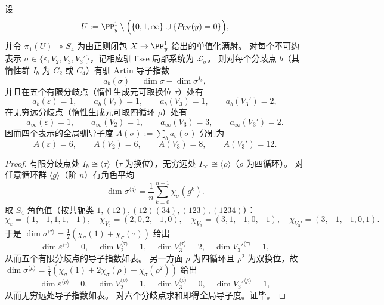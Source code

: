 \begin{conclusion}\label{con:xi-terminal-zm-s4-tame-artin-conductor-spectrum}
设
\[
U:=\PP^1_y\setminus\Bigl(\{0,1,\infty\}\cup\{P_{\mathrm{LY}}(y)=0\}\Bigr),
\]
并令 \(\pi_1(U)\twoheadrightarrow S_4\) 为由正则闭包 \(X\to\PP^1_y\) 给出的单值化满射。
对每个不可约表示 \(\sigma\in\{\varepsilon,V_2,V_3,V_3'\}\)，记相应驯 lisse 局部系统为 \(\mathcal L_\sigma\)。
则对每个分歧点 \(b\)（其惰性群 \(I_b\) 为 \(C_2\) 或 \(C_4\)）有驯 Artin 导子指数
\[
a_b(\sigma)=\dim\sigma-\dim\sigma^{I_b},
\]
并且在五个有限分歧点（惰性生成元可取换位 \(\tau\)）处有
\[
a_b(\varepsilon)=1,\qquad a_b(V_2)=1,\qquad a_b(V_3)=1,\qquad a_b(V_3')=2,
\]
在无穷远分歧点（惰性生成元可取四循环 \(\rho\)）处有
\[
a_\infty(\varepsilon)=1,\qquad a_\infty(V_2)=1,\qquad a_\infty(V_3)=3,\qquad a_\infty(V_3')=2.
\]
因而四个表示的全局驯导子度
\(
A(\sigma):=\sum_b a_b(\sigma)
\)
分别为
\[
A(\varepsilon)=6,\qquad A(V_2)=6,\qquad A(V_3)=8,\qquad A(V_3')=12.
\]
\end{conclusion}
\begin{proof}
有限分歧点处 \(I_b\cong\langle\tau\rangle\)（\(\tau\) 为换位），无穷远处 \(I_\infty\cong\langle\rho\rangle\)（\(\rho\) 为四循环）。
对任意循环群 \(\langle g\rangle\)（阶 \(n\)）有角色平均
\[
\dim\sigma^{\langle g\rangle}=\frac1n\sum_{k=0}^{n-1}\chi_\sigma(g^k).
\]
取 \(S_4\) 角色值（按共轭类 \(1,(12),(12)(34),(123),(1234)\)）：
\[
\chi_{\varepsilon}=(1,-1,1,1,-1),\quad
\chi_{V_2}=(2,0,2,-1,0),\quad
\chi_{V_3}=(3,1,-1,0,-1),\quad
\chi_{V_3'}=(3,-1,-1,0,1).
\]
于是
\(
\dim\sigma^{\langle\tau\rangle}=\tfrac12(\chi_\sigma(1)+\chi_\sigma(\tau))
\)
给出
\[
\dim\varepsilon^{\langle\tau\rangle}=0,\quad
\dim V_2^{\langle\tau\rangle}=1,\quad
\dim V_3^{\langle\tau\rangle}=2,\quad
\dim V_3'^{\langle\tau\rangle}=1,
\]
从而五个有限分歧点的导子指数如表。
另一方面 \(\rho\) 为四循环且 \(\rho^2\) 为双换位，故
\(
\dim\sigma^{\langle\rho\rangle}=\tfrac14(\chi_\sigma(1)+2\chi_\sigma(\rho)+\chi_\sigma(\rho^2))
\)
给出
\[
\dim\varepsilon^{\langle\rho\rangle}=0,\quad
\dim V_2^{\langle\rho\rangle}=1,\quad
\dim V_3^{\langle\rho\rangle}=0,\quad
\dim V_3'^{\langle\rho\rangle}=1,
\]
从而无穷远处导子指数如表。
对六个分歧点求和即得全局导子度。证毕。
\end{proof}

